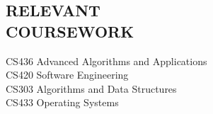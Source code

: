 \documentclass[margin, 10pt]{res} %
\begin{document}
\begin{resume}
\section{RELEVANT \\ COURSEWORK}

CS436 Advanced Algorithms and Applications \\
CS420 Software Engineering \\
CS303 Algorithms and Data Structures \\
CS433 Operating Systems



\end{resume}
\end{document}
